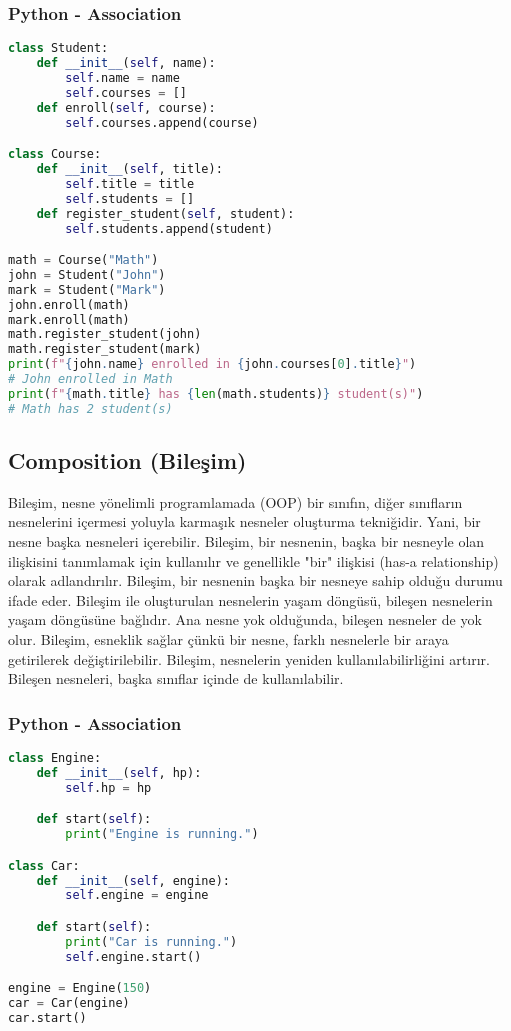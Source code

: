 \subsubsection{Python - Association}

\begin{lstlisting}[language=Python]
class Student:
    def __init__(self, name):
        self.name = name
        self.courses = []
    def enroll(self, course):
        self.courses.append(course)

class Course:
    def __init__(self, title):
        self.title = title
        self.students = []
    def register_student(self, student):
        self.students.append(student)

math = Course("Math")
john = Student("John")
mark = Student("Mark")
john.enroll(math)
mark.enroll(math)
math.register_student(john)
math.register_student(mark)
print(f"{john.name} enrolled in {john.courses[0].title}")
# John enrolled in Math
print(f"{math.title} has {len(math.students)} student(s)")
# Math has 2 student(s)
\end{lstlisting}

\newpage

\subsection{Composition (Bileşim)}

Bileşim, nesne yönelimli programlamada (OOP) bir sınıfın, diğer sınıfların nesnelerini içermesi yoluyla karmaşık nesneler oluşturma tekniğidir. Yani, bir nesne başka nesneleri içerebilir. Bileşim, bir nesnenin, başka bir nesneyle olan ilişkisini tanımlamak için kullanılır ve genellikle "bir" ilişkisi (has-a relationship) olarak adlandırılır. Bileşim, bir nesnenin başka bir nesneye sahip olduğu durumu ifade eder. Bileşim ile oluşturulan nesnelerin yaşam döngüsü, bileşen nesnelerin yaşam döngüsüne bağlıdır. Ana nesne yok olduğunda, bileşen nesneler de yok olur. Bileşim, esneklik sağlar çünkü bir nesne, farklı nesnelerle bir araya getirilerek değiştirilebilir. Bileşim, nesnelerin yeniden kullanılabilirliğini artırır. Bileşen nesneleri, başka sınıflar içinde de kullanılabilir.

\subsubsection{Python - Association}

\begin{lstlisting}[language=Python]
class Engine:
    def __init__(self, hp):
        self.hp = hp

    def start(self):
        print("Engine is running.")

class Car:
    def __init__(self, engine):
        self.engine = engine

    def start(self):
        print("Car is running.")
        self.engine.start()

engine = Engine(150)
car = Car(engine)
car.start()
\end{lstlisting}

